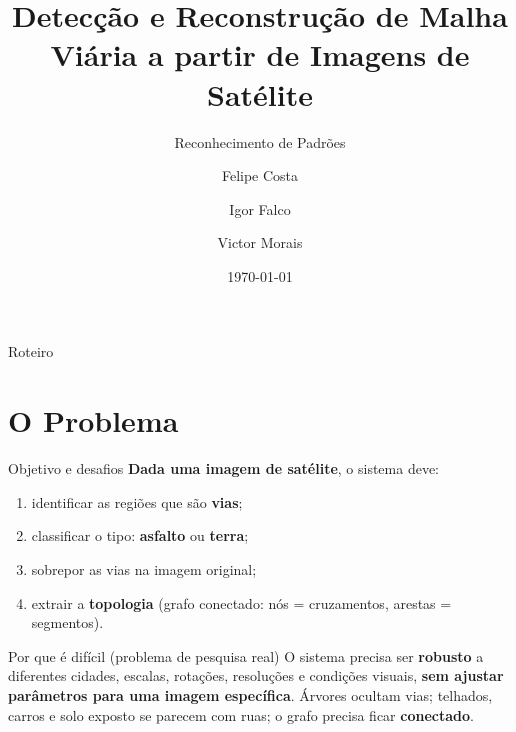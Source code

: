 \documentclass{beamer}
\title[Malha Viária por Satélite]{Detecção e Reconstrução de Malha Viária a partir de Imagens de Satélite}
\subtitle{Reconhecimento de Padrões}
\author[Felipe / Igor / Victor]{Felipe Costa \and Igor Falco \and Victor Morais}
\institute[]{Reconhecimento de Padrões}
\date{\today}
\begin{document}
\begin{frame}
    \titlepage
\end{frame}

\begin{frame}{Roteiro}
    \tableofcontents
\end{frame}

\section{O Problema}

\begin{frame}{Objetivo e desafios}
    \textbf{Dada uma imagem de satélite}, o sistema deve:
    \begin{enumerate}\setlength{\itemsep}{2pt}
        \item identificar as regiões que são \textbf{vias};
        \item classificar o tipo: \textbf{asfalto} ou \textbf{terra};
        \item sobrepor as vias na imagem original;
        \item extrair a \textbf{topologia} (grafo conectado: nós = cruzamentos, arestas = segmentos).
    \end{enumerate}
    \vspace{0.2cm}
    \begin{alertblock}{Por que é difícil (problema de pesquisa real)}
        \footnotesize O sistema precisa ser \textbf{robusto} a diferentes cidades, escalas, rotações, resoluções e condições visuais, \textbf{sem ajustar parâmetros para uma imagem específica}. Árvores ocultam vias; telhados, carros e solo exposto se parecem com ruas; o grafo precisa ficar \textbf{conectado}.
    \end{alertblock}
\end{frame}
\end{document}
